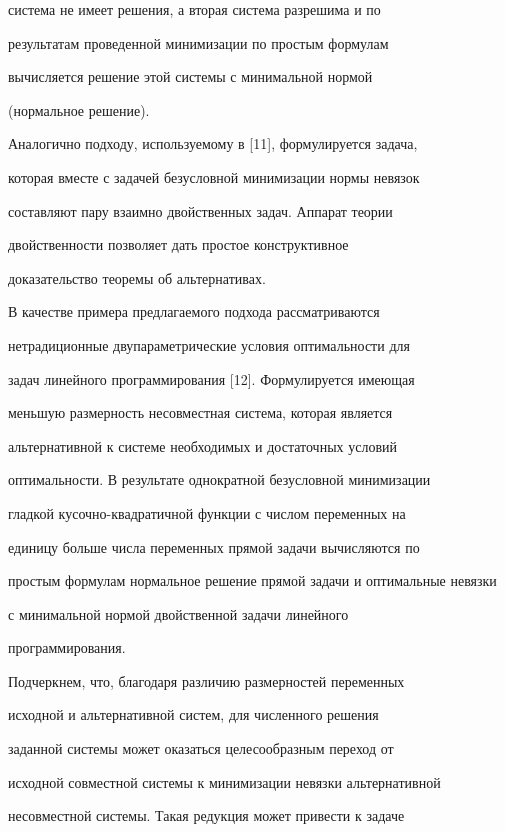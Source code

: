 система не имеет решения, а вторая система разрешима и по


результатам проведенной минимизации по простым формулам


вычисляется решение этой системы с минимальной нормой


(нормальное решение).





Аналогично подходу, используемому в [11], формулируется задача,


которая вместе с задачей безусловной минимизации нормы невязок


составляют пару взаимно двойственных задач. Аппарат теории


двойственности позволяет дать простое конструктивное


доказательство теоремы об альтернативах.





В качестве примера предлагаемого подхода рассматриваются


нетрадиционные двупараметрические условия оптимальности для


задач линейного программирования [12]. Формулируется имеющая


меньшую размерность несовместная система, которая является


альтернативной к системе необходимых и достаточных условий


оптимальности. В результате однократной безусловной минимизации


гладкой кусочно-квадратичной функции с числом переменных на


единицу больше числа переменных прямой задачи вычисляются по


простым формулам нормальное решение прямой задачи и оптимальные невязки


с минимальной нормой двойственной задачи линейного


программирования.





Подчеркнем, что, благодаря различию размерностей переменных


исходной и альтернативной систем, для численного решения


заданной системы может оказаться целесообразным переход от


исходной совместной системы к минимизации невязки альтернативной


несовместной системы. Такая редукция может привести к задаче


